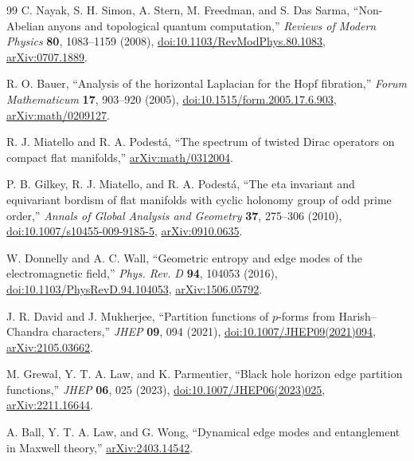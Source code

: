 \documentclass[aps,prd,reprint,nofootinbib,superscriptaddress,floatfix]{revtex4-2}
\numberwithin{equation}{section}
\theoremstyle{definition}
\theoremstyle{plain}
\begin{document}
\begin{thebibliography}{99}
C. Nayak, S. H. Simon, A. Stern, M. Freedman, and S. Das Sarma,
``Non-Abelian anyons and topological quantum computation,''
\emph{Reviews of Modern Physics} \textbf{80}, 1083--1159 (2008),
\href{https://doi.org/10.1103/RevModPhys.80.1083}{doi:10.1103/RevModPhys.80.1083},
\href{https://arxiv.org/abs/0707.1889}{arXiv:0707.1889}.





R. O. Bauer,
``Analysis of the horizontal Laplacian for the Hopf fibration,''
\emph{Forum Mathematicum} \textbf{17}, 903--920 (2005),
\href{https://doi.org/10.1515/form.2005.17.6.903}{doi:10.1515/form.2005.17.6.903},
\href{https://arxiv.org/abs/math/0209127}{arXiv:math/0209127}.

R. J. Miatello and R. A. Podest\'a,
``The spectrum of twisted Dirac operators on compact flat manifolds,''
\href{https://arxiv.org/abs/math/0312004}{arXiv:math/0312004}.

P. B. Gilkey, R. J. Miatello, and R. A. Podest\'a,
``The eta invariant and equivariant bordism of flat manifolds with cyclic
holonomy group of odd prime order,''
\emph{Annals of Global Analysis and Geometry} \textbf{37}, 275--306 (2010),
\href{https://doi.org/10.1007/s10455-009-9185-5}{doi:10.1007/s10455-009-9185-5},
\href{https://arxiv.org/abs/0910.0635}{arXiv:0910.0635}.

W. Donnelly and A. C. Wall,
``Geometric entropy and edge modes of the electromagnetic field,''
\emph{Phys. Rev. D} \textbf{94}, 104053 (2016),
\href{https://doi.org/10.1103/PhysRevD.94.104053}{doi:10.1103/PhysRevD.94.104053},
\href{https://arxiv.org/abs/1506.05792}{arXiv:1506.05792}.

J. R. David and J. Mukherjee,
``Partition functions of \(p\)-forms from Harish--Chandra characters,''
\emph{JHEP} \textbf{09}, 094 (2021),
\href{https://doi.org/10.1007/JHEP09(2021)094}{doi:10.1007/JHEP09(2021)094},
\href{https://arxiv.org/abs/2105.03662}{arXiv:2105.03662}.

M. Grewal, Y. T. A. Law, and K. Parmentier,
``Black hole horizon edge partition functions,''
\emph{JHEP} \textbf{06}, 025 (2023),
\href{https://doi.org/10.1007/JHEP06(2023)025}{doi:10.1007/JHEP06(2023)025},
\href{https://arxiv.org/abs/2211.16644}{arXiv:2211.16644}.

A. Ball, Y. T. A. Law, and G. Wong,
``Dynamical edge modes and entanglement in Maxwell theory,''
\href{https://arxiv.org/abs/2403.14542}{arXiv:2403.14542}.


\end{thebibliography}
\end{document}
